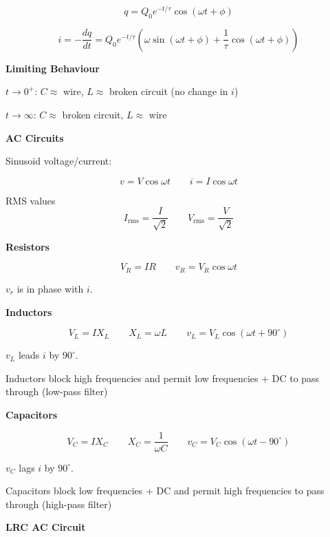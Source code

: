 \documentclass[10pt]{article}
\newcommand\sectionheading[1]{\begin{center}\large{\textbf{#1}}\end{center}\normalsize}
\newcommand\heading[1]{\medskip\textbf{#1}\medskip}
\begin{document}
\begin{multicols*}{3}
\[q=Q_0e^{-t/\tau}\cos(\omega t+\phi)\]

\[i=-\frac{dq}{dt}=Q_0 e^{-t/\tau}(\omega \sin (\omega t+\phi)+\frac{1}{\tau}\cos(\omega t+\phi))\]

\heading{Limiting Behaviour}

$t\to 0^+$: $C\approx$ wire, $L\approx$ broken circuit (no change in $i$)

$t\to\infty$: $C\approx$ broken circuit, $L\approx$ wire

\sectionheading{AC Circuits}

Sinusoid voltage/current:

\[v=V\cos\omega t \qquad i=I\cos\omega t\]

RMS values 
\[I_{\text{rms}}=\frac{I}{\sqrt{2}} \qquad V_{\text{rms}}=\frac{V}{\sqrt{2}}\]

\heading{Resistors}

\[V_R=IR \qquad v_R=V_R\cos\omega t\]

$v_r$ is in phase with $i$.

\heading{Inductors}

\[V_L = IX_L \qquad X_L = \omega L \qquad v_L=V_L\cos(\omega t+90^\circ)\]

$v_L$ leads $i$ by $90^\circ$.

Inductors block high frequencies and permit low frequencies + DC to pass through (low-pass filter)

\heading{Capacitors}

\[V_C=IX_C \qquad X_C=\frac{1}{\omega C} \qquad v_C=V_C\cos(\omega t-90^\circ)\]

$v_C$ lags $i$ by $90^\circ$.

Capacitors block low frequencies + DC and permit high frequencies to pass through (high-pass filter)

\sectionheading{LRC AC Circuit}


\end{multicols*}
\end{document}
